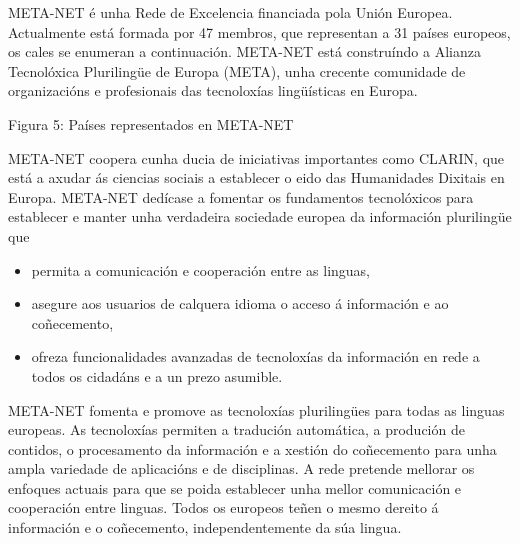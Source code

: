 \begin{multicols}{2}
\begin{itemize}
\begin{multicols}{2}
\end{multicols}


\cleardoublepage



\begin{multicols}{2}

   META-NET é unha Rede de Excelencia financiada pola Unión Europea. Actualmente está formada por 47 membros, que representan a 31 países europeos, os cales se enumeran a continuación. META-NET está construíndo a Alianza Tecnolóxica Plurilingüe de Europa (META), unha crecente comunidade de organizacións e profesionais das tecnoloxías lingüísticas en Europa. 

	Figura 5: Países representados en META-NET

META-NET coopera cunha ducia de iniciativas importantes como CLARIN, que está a axudar ás ciencias sociais a establecer o eido das Humanidades Dixitais en Europa. META-NET dedícase a fomentar os fundamentos tecnolóxicos para establecer e manter unha verdadeira sociedade europea da información plurilingüe que

\begin{itemize}

	\item permita a comunicación e cooperación entre as linguas, 
	\item asegure aos usuarios de calquera idioma o acceso á información e ao coñecemento,
	\item ofreza funcionalidades avanzadas de tecnoloxías da información en rede a todos os cidadáns e a un prezo asumible. 
\end{itemize}

META-NET fomenta e promove as tecnoloxías plurilingües para todas as linguas europeas. As tecnoloxías permiten a tradución automática, a produción de contidos, o procesamento da información e a xestión do coñecemento para unha ampla variedade de aplicacións e de disciplinas. A rede pretende mellorar os enfoques actuais para que se poida establecer unha mellor comunicación e cooperación entre linguas. Todos os europeos teñen o mesmo dereito á información e o coñecemento, independentemente da súa lingua. 


\end{multicols}
\cleardoublepage




\end{itemize}
\end{multicols}
